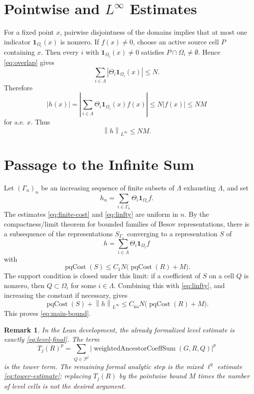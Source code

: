 \documentclass[11pt]{article}
\newtheorem{remark}{Remark}
\newcommand{\Pcal}{\mathcal P}
\newcommand{\Om}{\Omega}
\newcommand{\Th}{\Theta}
\newcommand{\1}{\mathbf 1}
\newcommand{\abs}[1]{\left|#1\right|}
\newcommand{\norm}[1]{\left\|#1\right\|}
\begin{document}
\section*{Pointwise and \(L^\infty\) Estimates}

For a fixed point \(x\), pairwise disjointness of the domains implies that at
most one indicator \(\1_{\Om_i}(x)\) is nonzero.  If \(f(x)\neq0\), choose an
active source cell \(P\) containing \(x\).  Then every \(i\) with
\(\1_{\Om_i}(x)\neq0\) satisfies \(P\cap\Om_i\neq\emptyset\).  Hence
\eqref{eq:overlap} gives
\[
  \sum_{i\in\Lambda}
  \abs{\Th_i\1_{\Om_i}(x)}
  \le N.
\]
Therefore
\[
  \abs{h(x)}
  =
  \left|
    \sum_{i\in\Lambda}
    \Th_i\1_{\Om_i}(x)f(x)
  \right|
  \le
  N\abs{f(x)}
  \le
  NM
\]
for a.e. \(x\).  Thus
\begin{equation}\label{eq:linfty}
  \norm{h}_{L^\infty}\le NM.
\end{equation}

\section*{Passage to the Infinite Sum}

Let \((\Gamma_n)_n\) be an increasing sequence of finite subsets of
\(\Lambda\) exhausting \(\Lambda\), and set
\[
  h_n=\sum_{i\in\Gamma_n}\Th_i\1_{\Om_i}f .
\]
The estimates \eqref{eq:finite-cost} and \eqref{eq:linfty} are uniform in
\(n\).  By the compactness/limit theorem for bounded families of Besov
representations, there is a subsequence of the representations \(S_{\Gamma_n}\)
converging to a representation \(S\) of
\[
  h=\sum_{i\in\Lambda}\Th_i\1_{\Om_i}f
\]
with
\[
  \operatorname{pqCost}(S)
  \le
  C_1N\bigl(\operatorname{pqCost}(R)+M\bigr).
\]
The support condition is closed under this limit: if a coefficient of \(S\) on
a cell \(Q\) is nonzero, then \(Q\subset\Om_i\) for some \(i\in\Lambda\).
Combining this with \eqref{eq:linfty}, and increasing the constant if
necessary, gives
\[
  \operatorname{pqCost}(S)+\norm{h}_{L^\infty}
  \le
  C_{\mathrm{na}}N
  \bigl(\operatorname{pqCost}(R)+M\bigr).
\]
This proves \eqref{eq:main-bound}.

\begin{remark}
In the Lean development, the already formalized level estimate is exactly
\eqref{eq:level-final}.  The term
\[
  T_j(R)^p
  =
  \sum_{Q\in\Pcal^j}
  \left|
    \operatorname{weightedAncestorCoeffSum}(G,R,Q)
  \right|^p
\]
is the tower term.  The remaining formal analytic step is the mixed
\(\ell^q\) estimate \eqref{eq:tower-estimate}; replacing \(T_j(R)\) by the
pointwise bound \(M\) times the number of level cells is not the desired
argument.
\end{remark}
\end{document}
